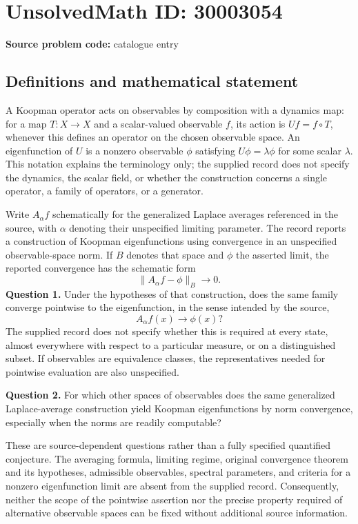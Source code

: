 \documentclass[11pt]{article}
\begin{document}
\section*{UnsolvedMath ID: 30003054}
\textbf{Source problem code:} catalogue entry
\subsection{Definitions and mathematical statement}
A Koopman operator acts on observables by composition with a dynamics map: for a map \(T:X\to X\) and a scalar-valued observable \(f\), its action is \(Uf=f\circ T\), whenever this defines an operator on the chosen observable space. An eigenfunction of \(U\) is a nonzero observable \(\phi\) satisfying \(U\phi=\lambda\phi\) for some scalar \(\lambda\). This notation explains the terminology only; the supplied record does not specify the dynamics, the scalar field, or whether the construction concerns a single operator, a family of operators, or a generator.

Write \(A_\alpha f\) schematically for the generalized Laplace averages referenced in the source, with \(\alpha\) denoting their unspecified limiting parameter. The record reports a construction of Koopman eigenfunctions using convergence in an unspecified observable-space norm. If \(B\) denotes that space and \(\phi\) the asserted limit, the reported convergence has the schematic form
\[
\lVert A_\alpha f-\phi\rVert_B\longrightarrow 0.
\]
\textbf{Question 1.} Under the hypotheses of that construction, does the same family converge pointwise to the eigenfunction, in the sense intended by the source,
\[
A_\alpha f(x)\longrightarrow\phi(x)?
\]
The supplied record does not specify whether this is required at every state, almost everywhere with respect to a particular measure, or on a distinguished subset. If observables are equivalence classes, the representatives needed for pointwise evaluation are also unspecified.

\textbf{Question 2.} For which other spaces of observables does the same generalized Laplace-average construction yield Koopman eigenfunctions by norm convergence, especially when the norms are readily computable?

These are source-dependent questions rather than a fully specified quantified conjecture. The averaging formula, limiting regime, original convergence theorem and its hypotheses, admissible observables, spectral parameters, and criteria for a nonzero eigenfunction limit are absent from the supplied record. Consequently, neither the scope of the pointwise assertion nor the precise property required of alternative observable spaces can be fixed without additional source information.
\end{document}

